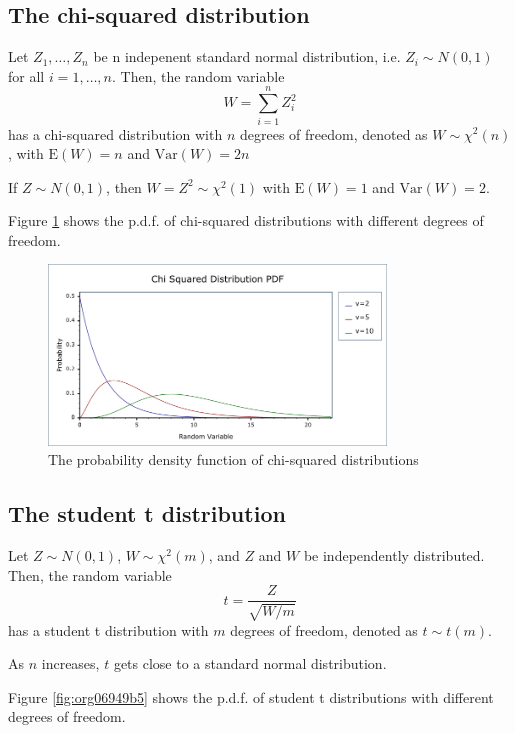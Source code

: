 \documentclass[a4paper,11pt]{article}
\begin{document}
\subsection{The chi-squared distribution}
\label{sec:org588a23b}

Let \(Z_1, \ldots, Z_n\) be n indepenent standard normal distribution,
i.e. \(Z_i \sim N(0, 1)\) for all \(i = 1, \ldots, n\). Then, the random
variable
\[W = \sum_{i=1}^n Z^2_i \]
has a chi-squared distribution with \(n\) degrees of freedom, denoted as
\(W \sim \chi^2(n)\), with \(\mathrm{E}(W) = n\) and \(\mathrm{Var}(W) = 2n\)

If \(Z \sim N(0, 1)\), then \(W = Z^2 \sim \chi^2(1)\) with \(\mathrm{E}(W) =
1\) and \(\mathrm{Var}(W) = 2\).

Figure \ref{fig:orgb749954} shows the p.d.f. of chi-squared distributions
with different degrees of freedom. 

\begin{figure}[htbp]
\centering
\includegraphics[width=0.8\textwidth]{figure/chi_squared_pdf.png}
\caption{\label{fig:orgb749954}
The probability density function of chi-squared distributions}
\end{figure}

\subsection{The student t distribution}
\label{sec:org20cae88}

Let \(Z \sim N(0, 1)\), \(W \sim \chi^2(m)\), and \(Z\) and \(W\) be
independently distributed. Then, the random variable
\[t = \frac{Z}{\sqrt{W/m}} \]
has a student t distribution with \(m\) degrees of freedom, denoted as
\(t \sim t(m)\).

As \(n\) increases, \(t\) gets close to a standard normal distribution.

Figure \ref{fig:org06949b5} shows the p.d.f. of student t distributions
with different degrees of freedom. 
\end{document}

